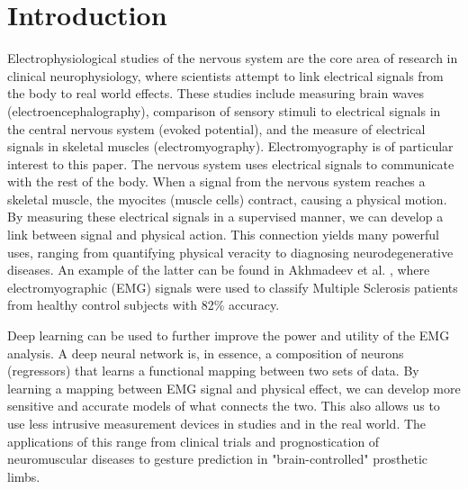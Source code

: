 \documentclass{llncs}
\begin{document}
\section{Introduction}
Electrophysiological studies of the nervous system are the core area of research in clinical neurophysiology, where scientists attempt to link electrical signals from the body to real world effects. These studies include measuring brain waves (electroencephalography), comparison of sensory stimuli to electrical signals in the central nervous system (evoked potential), and the measure of electrical signals in skeletal muscles (electromyography). 
Electromyography is of particular interest to this paper. The nervous system uses electrical signals to communicate with the rest of the body. When a signal from the nervous system reaches a skeletal muscle, the myocites (muscle cells) contract, causing a physical motion. By measuring these electrical signals in a supervised manner, we can develop a link between signal and physical action. This connection yields many powerful uses, ranging from quantifying physical veracity to diagnosing neurodegenerative diseases. An example of the latter can be found in Akhmadeev et al. \cite{graves}, where electromyographic (EMG) signals were used to classify Multiple Sclerosis patients from healthy control subjects with 82\% accuracy.

Deep learning can be used to further improve the power and utility of the EMG analysis. A deep neural network is, in essence, a composition of neurons (regressors) that learns a functional mapping between two sets of data. By learning a mapping between EMG signal and physical effect, we can develop more sensitive and accurate models of what connects the two. This also allows us to use less intrusive measurement devices in studies and in the real world. The applications of this range from clinical trials and prognostication of neuromuscular diseases to gesture prediction in "brain-controlled" prosthetic limbs.

\end{document}
